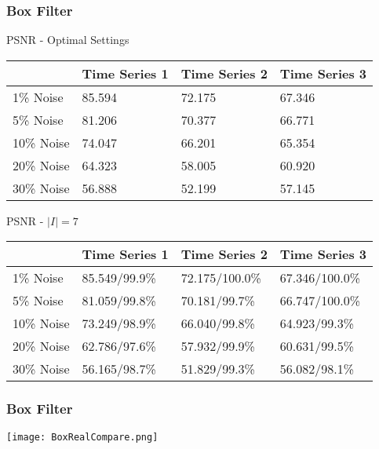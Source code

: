 \documentclass{beamer}
\begin{document}
\begin{frame}
\begin{center}
\frametitle{Box Filter}

\small{

PSNR - Optimal Settings

\begin{table}[h]
\begin{tabular}{l | l | l | l}
 & Time Series 1 & Time Series 2 & Time Series 3 \\ \hline
1\% Noise & 85.594 & 72.175 & 67.346 \\ \hline
5\% Noise & 81.206 & 70.377 & 66.771 \\ \hline
10\% Noise & 74.047 & 66.201 & 65.354 \\ \hline
20\% Noise & 64.323 & 58.005 & 60.920 \\ \hline
30\% Noise & 56.888 & 52.199 & 57.145
\end{tabular}
\end{table}

PSNR - $\lvert I \rvert = 7$

\begin{table}[h]
\begin{tabular}{l | l | l | l}
 & Time Series 1 & Time Series 2 & Time Series 3 \\ \hline
1\% Noise &85.549/99.9\% &72.175/100.0\% &67.346/100.0\% \\ \hline
5\% Noise &81.059/99.8\% &70.181/99.7\% & 66.747/100.0\% \\ \hline
10\% Noise &73.249/98.9\% &66.040/99.8\% & 64.923/99.3\% \\ \hline
20\% Noise &62.786/97.6\% &57.932/99.9\% &60.631/99.5\% \\ \hline
30\% Noise &56.165/98.7\% &51.829/99.3\% &56.082/98.1\%
\end{tabular}
\end{table}

}

\end{center}
\end{frame}


\begin{frame}
\begin{center}
\frametitle{Box Filter}

\texttt{[image: BoxRealCompare.png]}

\end{center}
\end{frame}
\end{document}
